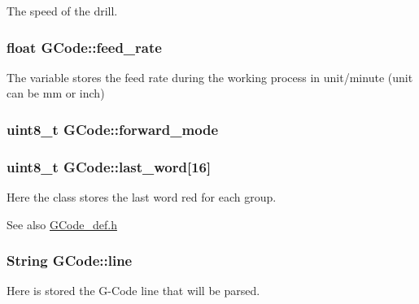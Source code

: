 The speed of the drill. 

\hypertarget{class_g_code_a0115efce11fdffa2c59304706ecacede}{
\subsubsection[{feed\+\_\+rate}]{\setlength{\rightskip}{0pt plus 5cm}float G\+Code\+::feed\+\_\+rate}}\label{class_g_code_a0115efce11fdffa2c59304706ecacede}


The variable stores the feed rate during the working process in unit/minute (unit can be mm or inch) 

\hypertarget{class_g_code_acbf5f3b9aeffe27d3f87e9d57b487146}{
\subsubsection[{forward\+\_\+mode}]{\setlength{\rightskip}{0pt plus 5cm}uint8\+\_\+t G\+Code\+::forward\+\_\+mode}}\label{class_g_code_acbf5f3b9aeffe27d3f87e9d57b487146}
\hypertarget{class_g_code_a3674417ee3c5141c6655c05f6ffa0799}{
\subsubsection[{last\+\_\+word}]{\setlength{\rightskip}{0pt plus 5cm}uint8\+\_\+t G\+Code\+::last\+\_\+word\mbox{[}16\mbox{]}}}\label{class_g_code_a3674417ee3c5141c6655c05f6ffa0799}


Here the class stores the last word red for each group. 

\begin{DoxySeeAlso}{See also}
\hyperlink{_g_code__def_8h}{G\+Code\+\_\+def.\+h} 
\end{DoxySeeAlso}
\hypertarget{class_g_code_a20d7c90740e9e139b24f68336ad8c8f1}{
\subsubsection[{line}]{\setlength{\rightskip}{0pt plus 5cm}String G\+Code\+::line}}\label{class_g_code_a20d7c90740e9e139b24f68336ad8c8f1}


Here is stored the G-\/\+Code line that will be parsed. 

